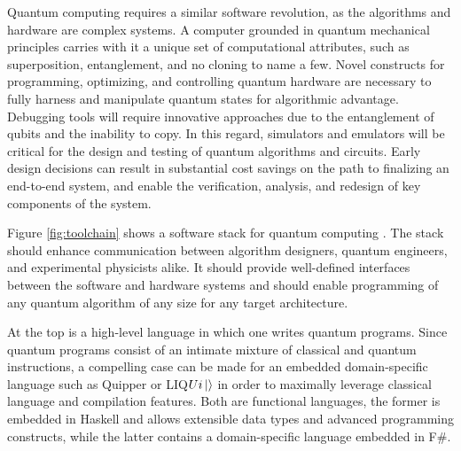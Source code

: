 \documentclass[journal]{IEEEtran}
\begin{document}
Quantum computing requires a similar software revolution, as the algorithms and hardware are complex systems.
A computer grounded in quantum mechanical principles carries with it a unique set of computational attributes, such as superposition, entanglement, and no cloning to name a few.  Novel constructs for programming, optimizing, and controlling quantum hardware are necessary to fully harness and manipulate quantum states for algorithmic advantage. Debugging tools will require innovative approaches due to the entanglement of qubits and the inability to copy.  In this regard, simulators and emulators will be critical for the design and testing of quantum algorithms and circuits. Early design decisions can result in substantial cost savings on the path to finalizing an end-to-end system, and enable the verification, analysis, and redesign of key components of the system.


Figure \ref{fig:toolchain} shows a software stack for quantum computing \cite{stack}.
The stack should enhance communication between algorithm designers, quantum engineers, and experimental physicists alike.
It should provide well-defined interfaces between the software and hardware systems and should enable programming of any quantum algorithm of any size for any target architecture.

At the top is a high-level language in which one writes quantum programs.
Since quantum programs consist of an intimate mixture of classical and quantum instructions, a compelling case can be made for an embedded domain-specific language such as Quipper \cite{green13} or LIQ$Ui\ket{} $\cite{wecker14} in order to maximally leverage classical language and compilation features.
Both are functional languages, the former is embedded in Haskell and allows extensible data types and advanced programming constructs,
while the latter contains a domain-specific language embedded in F\#.
\end{document}
